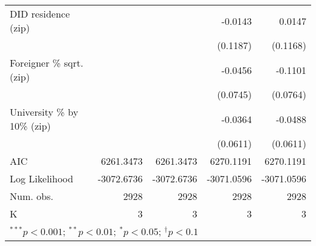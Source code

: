 \begin{tabular}{l D{.}{.}{5.11} D{.}{.}{5.7} D{.}{.}{5.11} D{.}{.}{5.7}}
DID residence (zip)               &                  &               & -0.0143          & 0.0147        \\
                                  &                  &               & (0.1187)         & (0.1168)      \\
Foreigner \% sqrt. (zip)          &                  &               & -0.0456          & -0.1101       \\
                                  &                  &               & (0.0745)         & (0.0764)      \\
University \% by 10\% (zip)       &                  &               & -0.0364          & -0.0488       \\
                                  &                  &               & (0.0611)         & (0.0611)      \\
\midrule
AIC                               & 6261.3473        & 6261.3473     & 6270.1191        & 6270.1191     \\
Log Likelihood                    & -3072.6736       & -3072.6736    & -3071.0596       & -3071.0596    \\
Num. obs.                         & 2928             & 2928          & 2928             & 2928          \\
K                                 & 3                & 3             & 3                & 3             \\
\bottomrule
{}
\end{tabular}
